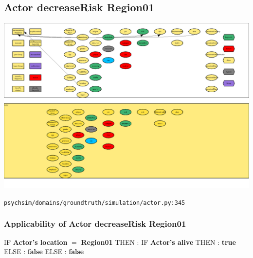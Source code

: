 \documentclass{article}%
\begin{document}
%
\subsection{Actor decreaseRisk Region01}%
\label{subsec:Actor decreaseRisk Region01}%
\includegraphics[width=\textwidth]{images/Actor-decreaseRisk-Region01.png}%
\begin{flushleft}%
\verb|psychsim/domains/groundtruth/simulation/actor.py:345|%
\end{flushleft}%
\subsubsection{Applicability of Actor decreaseRisk Region01}%
\label{ssubsec:Applicability of Actor decreaseRisk Region01}%
\begin{flushleft}%
IF %
\textbf{Actor's location}%
$=$%
\textbf{Region01}%
\linebreak%
\hspace*{2em}%
THEN %
: %
IF %
\textbf{Actor's alive}%
\linebreak%
\hspace*{4em}%
THEN %
: %
\textbf{true}%
\linebreak%
\hspace*{4em}%
ELSE %
: %
\textbf{false}%
\linebreak%
\hspace*{2em}%
ELSE %
: %
\textbf{false}%
\end{flushleft}

%
\end{document}
